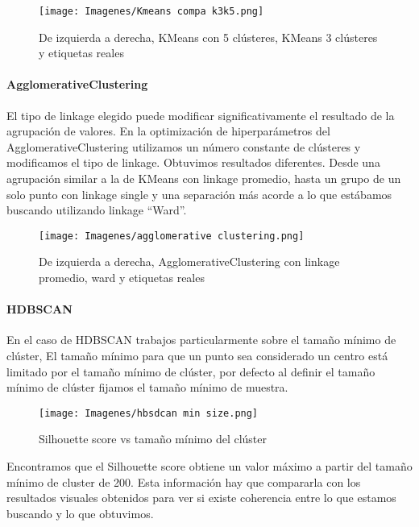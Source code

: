 \documentclass{article}
\begin{document}
\begin{figure}[!htb]
    \centering
    \texttt{[image: Imagenes/Kmeans compa k3k5.png]}
    \caption{De izquierda a derecha, KMeans con 5 clústeres, KMeans 3 clústeres y etiquetas reales}
    \label{fig:UMAP Kmeans compa cluster}
\end{figure}

\paragraph{AgglomerativeClustering}

El tipo de linkage elegido puede modificar significativamente el resultado de la agrupación de valores. En la optimización de hiperparámetros del AgglomerativeClustering utilizamos un número constante de clústeres y modificamos el tipo de linkage. Obtuvimos resultados diferentes. Desde una agrupación similar a la de KMeans con linkage promedio, hasta un grupo de un solo punto con linkage single y una separación más acorde a lo que estábamos buscando utilizando linkage “Ward”.

\begin{figure}[!htb]
    \centering
    \texttt{[image: Imagenes/agglomerative clustering.png]}
    \caption{De izquierda a derecha, AgglomerativeClustering con linkage promedio, ward y etiquetas reales}
    \label{fig:UMAP agglo}
\end{figure}
\clearpage

\paragraph{HDBSCAN}
En el caso de HDBSCAN trabajos particularmente sobre el tamaño mínimo de clúster,
El tamaño mínimo para que un punto sea considerado un centro está limitado por el tamaño mínimo de clúster, por defecto al definir el tamaño mínimo de clúster fijamos el tamaño mínimo de muestra.

\begin{figure}[!htb]
    \centering
    \texttt{[image: Imagenes/hbsdcan min size.png]}
    \caption{Silhouette score vs tamaño mínimo del clúster}
    \label{fig:UMAP min cluster}
\end{figure}

Encontramos que el Silhouette score obtiene un valor máximo a partir del tamaño mínimo de cluster de 200.
Esta información hay que compararla con los resultados visuales obtenidos para ver si existe coherencia entre lo que estamos buscando y lo que obtuvimos.
\end{document}
